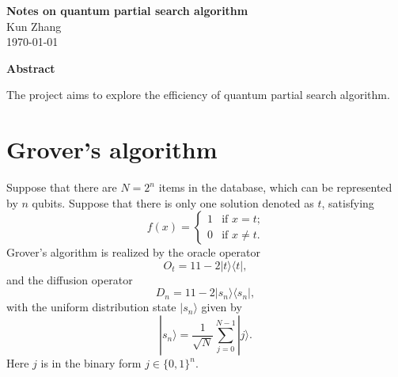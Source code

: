 \documentclass[a4paper,10pt]{article}
\numberwithin{equation}{section}
\begin{document}

\setlength{\unitlength}{1mm}



	
	\begin{center}
		{\large{\bf Notes on quantum partial search algorithm}}\\[7mm]
		\small{Kun Zhang}\\[3mm]
		
		\small{\today}\\[3mm]
		
	\end{center}

    \vspace{2mm}
	
	\begin{center}\parbox{13cm}{
			
			\centerline{\small  \bf Abstract}\vspace{2mm}
			
			The project aims to explore the efficiency of quantum partial search algorithm.
			}
		
	\end{center}
	\vspace{.2cm}
	 
	 
\section{Grover's algorithm}

Suppose that there are $N=2^n$ items in the database, which can be represented by $n$ qubits. Suppose that there is only one solution denoted as $t$, satisfying
\begin{equation}
    f(x) = \begin{cases}
      1 & \text{if $x=t$;}\\
      0 & \text{if $x\neq t$.}
    \end{cases} 
\end{equation}
Grover's algorithm is realized by the oracle operator 
\begin{equation}
\label{eq:O_t}
    O_t = 1\!\!1-2|t\rangle\langle t|,
\end{equation}
and the diffusion operator 
\begin{equation}
\label{eq:D_n}
    D_n = 1\!\!1 - 2|s_n\rangle\langle s_n|,
\end{equation}
with the uniform distribution state $|s_n\rangle$ given by
\begin{equation}
\label{eq:s_n}
    |s_n\rangle = \frac{1}{\sqrt N}\sum_{j=0}^{N-1}|j\rangle.
\end{equation}
Here $j$ is in the binary form $j\in\{0,1\}^n$. 
\end{document}

